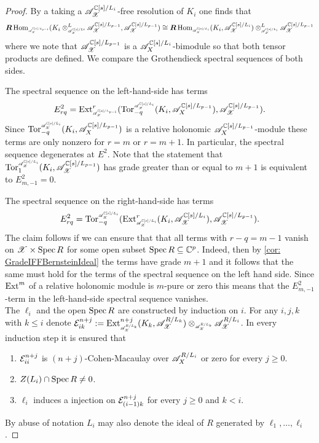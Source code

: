 \begin{proof}
  By a taking a $\mathscr{A}_{\mathscr{X}}^{\mathbb{C}[s]/L_{i}}$-free resolution of $K_i$ one finds that
  $$\bR \Hom_{\scaleto{\A_\X^{ \C[s]/L_{p-1} }}{8pt} }(K_i\otimes^L_{\scaleto{ \A_\X^{\C[s]/L{i}} }{8pt} } \A_\X^{\C[s]/L_{p-1} },\A_\X^{ \C[s]/L_{p-1}} ) \cong \bR \Hom_{ \scaleto{\A_\X^{\C[s]/L_{i}}}{8pt} } (K_i,\A_\X^{\C[s]/L_{i}}) \otimes^L_{\scaleto{ \A_\X^{\C[s]/L_{i}}}{8pt} } \A_\X^{\C[s]/L_{p-1}}$$
  where we note that $\mathscr{A}_{\mathscr{X}}^{\mathbb{C}[s]/L_{p-1}}$ is a $\mathscr{A}_X^{\mathbb{C}[s]/L_{i}}$-bimodule so that both tensor products are defined.
  We compare the Grothendieck spectral sequences of both sides.

  The spectral sequence on the left-hand-side has terms
  $$E_{rq}^2 = \Ex{\A_\X^{\C[s]/L_{p-1}}}{r}(\Tr{\A_\X^{\C[s]/L_{i}} }{-q}(K_i,\A_X^{\C[s]/L_{p-1}}),\A_\X^{\C[s]/L_{p-1}}).$$
  Since $\Tr{\A_\X^{\C[s]/L_{i}} }{-q}(K_i,\A_X^{\C[s]/L_{p-1}})$ is a relative holonomic $\mathscr{A}_X^{\mathbb{C}[s]/L_{p-1}}$-module these terms are only nonzero for $r=m$ or $r = m+1$.
  In particular, the spectral sequence degenerates at $E^2$.
  Note that the statement that $\Tr{\A_\X^{\C[s]/L_i}}{1}(K_i, \A_\X^{\C[s]/L_{p-1}})$ has grade greater than or equal to $m+1$ is equivalent to $E^2_{m,-1} = 0$.

  The spectral sequence on the right-hand-side has terms
  $$E^2_{rq} = \Tr{\A_\X^{\C[s]/L_{i}} }{-q}(\Ex{ \A_\X^{\C[s]/L_{i}} }{r} (K_i,\A_\X^{\C[s]/L_{i}}), \A_\X^{\C[s]/L_{p-1}}).$$
  The claim follows if we can ensure that that all terms with $r-q = m -1$ vanish on $\mathscr{X}\times\operatorname{Spec} R$ for some open subset $\operatorname{Spec} R\subseteq \mathbb{C}^p$.  %
  Indeed, then by \cref{cor: GradeIFFBernsteinIdeal} the terms have grade $m+1$ and it follows that the same must hold for the terms of the spectral sequence on the left hand side.
  Since $\operatorname{Ext}^{m}$ of a relative holonomic module is $m$-pure or zero this means that the $E^2_{m,-1}$-term in the left-hand-side spectral sequence vanishes.
  \\

\newpage
  The $\ell_i$ and the open $\operatorname{Spec} R$ are constructed by induction on $i$. For any $i,j,k$ with $k\leq i$ denote $\E_{ik}^{n+j}:= \Ex{\A_\X^{R/L_{k}} }{n+j}(K_k, \A_\X^{R/L_k}) \otimes_{\scaleto{\A_\X^{R/L_{k}}}{8pt}} \A_\X^{R/L_{i}}$.
  In every induction step it is ensured that
  \begin{enumerate}[label=(\roman*)]
    \item $\mathcal{E}_{ii}^{n+j}$ is $(n+j)$-Cohen-Macaulay over $\mathscr{A}_X^{R/L_i}$ or zero for every $j\geq 0$.
    \item $Z(L_i)\cap \operatorname{Spec} R \neq 0$.
    \item $\ell_i$ induces a injection on $\mathcal{E}_{(i-1)k}^{n+j}$
    for every $j\geq 0$ and $k<i$.
  \end{enumerate}
  By abuse of notation $L_i$ may also denote the ideal of $R$ generated by $\ell_1,\ldots,\ell_i$.


\end{proof}
